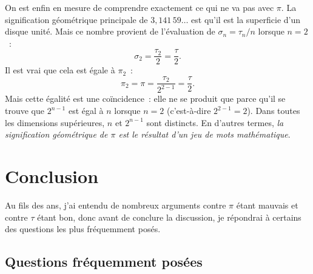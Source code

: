 On est enfin en mesure de comprendre exactement ce qui ne va pas avec $\pi$. La
signification géométrique principale de $3{,}141\,59\ldots$ est qu'il est la
superficie d'un disque unité. Mais ce nombre provient de l'évaluation de
$\sigma_n = \tau_n/n$ lorsque $n=2$~:
\[
\sigma_2 = \frac{\tau_2}{2} = \frac{\tau}{2}.
\]
Il est vrai que cela est égale à $\pi_2$~:
\[
\pi_2 = \pi = \frac{\tau_2}{2^{2-1}} = \frac{\tau}{2}.
\]
Mais cette égalité est une coïncidence~: elle ne se produit que parce qu'il se
trouve que $2^{n-1}$ est égal à $n$ lorsque $n=2$ (c'est-à-dire $2^{2-1} = 2$).
Dans toutes les dimensions supérieures, $n$ et $2^{n-1}$ sont distincts. En
d'autres termes, \emph{la signification géométrique de $\pi$ est le résultat
d'un jeu de mots mathématique}.


\section{Conclusion}
\label{sec:conclusion}

Au fils des ans, j'ai entendu de nombreux arguments contre $\pi$ étant mauvais
et contre $\tau$ étant bon, donc avant de conclure la discussion, je répondrai à
certains des questions les plus fréquemment posés.

  \subsection{Questions fréquemment posées} %
  \label{sec:faq}

